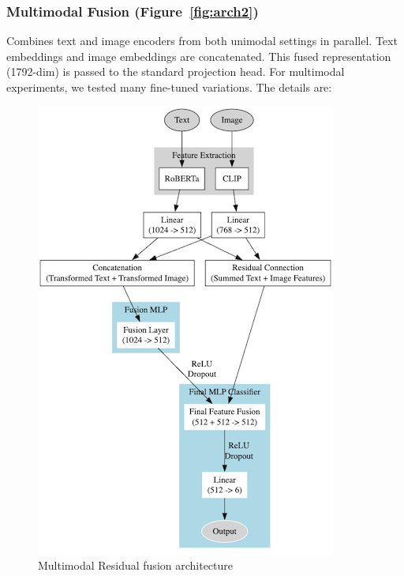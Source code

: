 \subsubsection*{Multimodal Fusion (Figure~\ref{fig:arch2})}
Combines text and image encoders from both unimodal settings in parallel. Text embeddings and image embeddings are concatenated. This fused representation (1792-dim) is passed to the standard projection head. For multimodal experiments, we tested many fine-tuned variations. The details are:

\begin{figure}[ht]
    \centering
    \includegraphics[height=0.6\textheight]{images/residual.png}
    \caption{Multimodal Residual fusion architecture}
    \label{fig:residual}
\end{figure}

